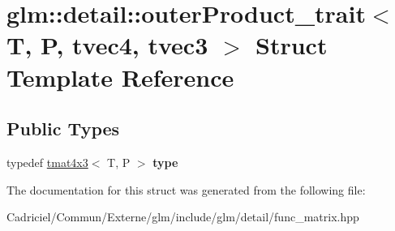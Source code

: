 \hypertarget{structglm_1_1detail_1_1outer_product__trait_3_01_t_00_01_p_00_01tvec4_00_01tvec3_01_4}{}\section{glm\+:\+:detail\+:\+:outer\+Product\+\_\+trait$<$ T, P, tvec4, tvec3 $>$ Struct Template Reference}
\label{structglm_1_1detail_1_1outer_product__trait_3_01_t_00_01_p_00_01tvec4_00_01tvec3_01_4}
\subsection*{Public Types}
\begin{DoxyCompactItemize}
\item 
typedef \hyperlink{structglm_1_1detail_1_1tmat4x3}{tmat4x3}$<$ T, P $>$ {\bfseries type}\hypertarget{structglm_1_1detail_1_1outer_product__trait_3_01_t_00_01_p_00_01tvec4_00_01tvec3_01_4_ac754af38f5684e757b9fcc70ecaea5c8}{}\label{structglm_1_1detail_1_1outer_product__trait_3_01_t_00_01_p_00_01tvec4_00_01tvec3_01_4_ac754af38f5684e757b9fcc70ecaea5c8}

\end{DoxyCompactItemize}


The documentation for this struct was generated from the following file\+:\begin{DoxyCompactItemize}
\item 
Cadriciel/\+Commun/\+Externe/glm/include/glm/detail/func\+\_\+matrix.\+hpp\end{DoxyCompactItemize}
